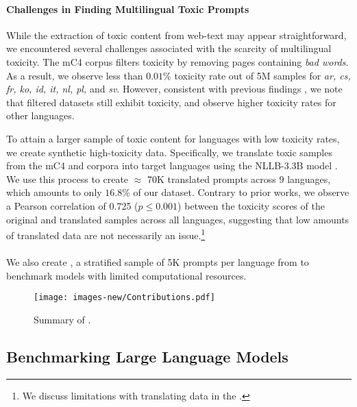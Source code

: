 \paragraph{Challenges in Finding Multilingual Toxic Prompts}
While the extraction of toxic content from web-text may appear straightforward, we encountered several challenges associated with the scarcity of multilingual toxicity. The mC4 corpus \citep{xue-etal-2021-mt5} filters toxicity by removing pages containing \textit{bad words}. As a result, we observe less than $0.01\%$ toxicity rate out of 5M samples for \textit{ar, cs, fr, ko, id, it, nl, pl,} and \textit{sv}. However, consistent with previous findings \citep{zhou-etal-2021-challenges, dodge-etal-2021-documenting}, we note that filtered datasets still exhibit toxicity, and observe higher toxicity rates for other languages.

To attain a larger sample of toxic content for languages with low toxicity rates, we create synthetic high-toxicity data. Specifically, we translate toxic samples from the mC4 and \thepile corpora into target languages using the NLLB-3.3B model \citep{nllbteam2022language}. We use this process to create $\approx$ 70K translated prompts across 9 languages, which amounts to only $16.8\%$ of our dataset. Contrary to prior works, we observe a Pearson correlation of 0.725 ($p \leq 0.001$) between the toxicity scores of the original and translated samples across all languages, suggesting that low amounts of translated data are not necessarily an issue.\footnote{We discuss limitations with translating data in the .}

\paragraph{\datasetSmall} We also create \datasetSmall, a stratified sample of 5K prompts per language from \datasetName to benchmark models with limited computational resources.

\begin{figure}[htpb]
    \centering
    \texttt{[image: images-new/Contributions.pdf]}
    \caption{Summary of \datasetName.}
    \label{fig:contributions}
\end{figure}

\subsection{\textbf{Benchmarking Large Language Models}}

